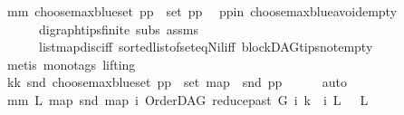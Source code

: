 \begin{isabellebody}
\ mm{\isacharcolon}{\kern0pt}\ {\isachardoublequoteopen}choose{\isacharunderscore}{\kern0pt}max{\isacharunderscore}{\kern0pt}blue{\isacharunderscore}{\kern0pt}set\ pp\ {\isasymin}\ set\ pp{\isachardoublequoteclose}\ \isamarkupfalse%
\ pp{\isacharunderscore}{\kern0pt}in\ choose{\isacharunderscore}{\kern0pt}max{\isacharunderscore}{\kern0pt}blue{\isacharunderscore}{\kern0pt}avoid{\isacharunderscore}{\kern0pt}empty\isanewline
\ \ \ \ \ \ digraph{\isachardot}{\kern0pt}tips{\isacharunderscore}{\kern0pt}finite\ subs\ assms{\isacharparenleft}{\kern0pt}{}{\isacharparenright}{\kern0pt}\isanewline
\ \ \ \ \ \ list{\isachardot}{\kern0pt}map{\isacharunderscore}{\kern0pt}disc{\isacharunderscore}{\kern0pt}iff\ sorted{\isacharunderscore}{\kern0pt}list{\isacharunderscore}{\kern0pt}of{\isacharunderscore}{\kern0pt}set{\isacharunderscore}{\kern0pt}eq{\isacharunderscore}{\kern0pt}Nil{\isacharunderscore}{\kern0pt}iff\ blockDAG{\isachardot}{\kern0pt}tips{\isacharunderscore}{\kern0pt}not{\isacharunderscore}{\kern0pt}empty\ \isanewline
\ \ \ \ \isamarkupfalse%
\ {\isacharparenleft}{\kern0pt}metis\ {\isacharparenleft}{\kern0pt}mono{\isacharunderscore}{\kern0pt}tags{\isacharcomma}{\kern0pt}\ lifting{\isacharparenright}{\kern0pt}{\isacharparenright}{\kern0pt}\ \ \isanewline
\ \ \isamarkupfalse%
\ \isamarkupfalse%
\ kk{\isacharcolon}{\kern0pt}\ {\isachardoublequoteopen}snd\ {\isacharparenleft}{\kern0pt}choose{\isacharunderscore}{\kern0pt}max{\isacharunderscore}{\kern0pt}blue{\isacharunderscore}{\kern0pt}set\ pp{\isacharparenright}{\kern0pt}\ {\isasymin}\ set\ {\isacharparenleft}{\kern0pt}map\ \ snd\ pp{\isacharparenright}{\kern0pt}{\isachardoublequoteclose}\isanewline
\ \ \ \ \isamarkupfalse%
\ auto\ \isanewline
\ \ \isamarkupfalse%
\ mm{}{\isacharcolon}{\kern0pt}\ {\isachardoublequoteopen}{\isasymAnd}L{\isachardot}{\kern0pt}\ {\isacharparenleft}{\kern0pt}map\ snd\ {\isacharparenleft}{\kern0pt}map\ {\isacharparenleft}{\kern0pt}{\isasymlambda}i{\isachardot}{\kern0pt}\ {\isacharparenleft}{\kern0pt}{\isacharparenleft}{\kern0pt}OrderDAG\ {\isacharparenleft}{\kern0pt}reduce{\isacharunderscore}{\kern0pt}past\ G\ i{\isacharparenright}{\kern0pt}\ k{\isacharparenright}{\kern0pt}\ {\isacharcomma}{\kern0pt}\ i{\isacharparenright}{\kern0pt}{\isacharparenright}{\kern0pt}\ L{\isacharparenright}{\kern0pt}{\isacharparenright}{\kern0pt}\ {\isacharequal}{\kern0pt}\ \ L{\isachardoublequoteclose}\ \isanewline
\ \ \isamarkupfalse%
\ {\isacharminus}{\kern0pt}\isanewline

\end{isabellebody}

